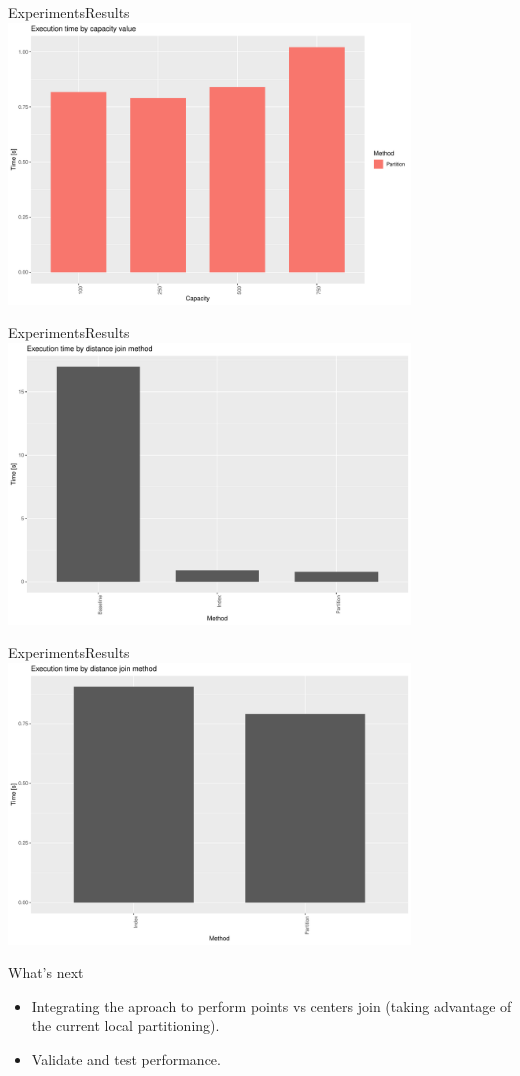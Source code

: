 \documentclass{beamer}
\begin{document}
\begin{frame}{Experiments}{Results}
    \centering
    \includegraphics[width=0.8\textwidth]{figures/ByCapacity}
\end{frame}
\begin{frame}{Experiments}{Results}
    \centering
    \includegraphics[width=0.8\textwidth]{figures/ByMethod1}
\end{frame}
\begin{frame}{Experiments}{Results}
    \centering
    \includegraphics[width=0.8\textwidth]{figures/ByMethod2}
\end{frame}

\begin{frame}{What's next}
    \begin{itemize}
        \item Integrating the aproach to perform points vs centers join (taking advantage of the current local partitioning).
        \item Validate and test performance.
    \end{itemize}
\end{frame}
\end{document}
